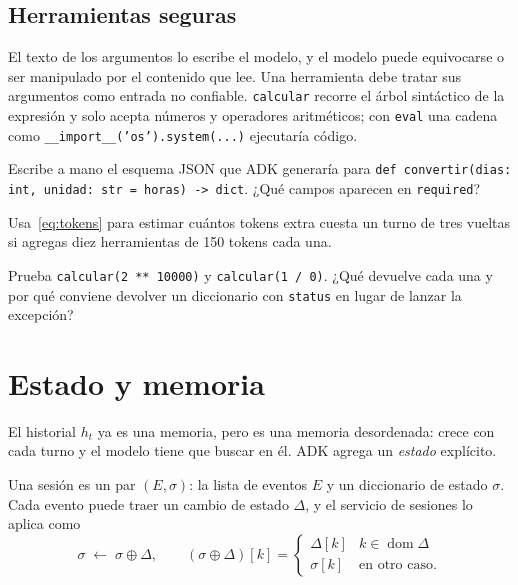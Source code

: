 \documentclass[11pt,letterpaper,oneside]{report}
\newcommand{\codigoagente}{../../../agentes/asistente_teresa/agent.py}
\begin{document}
\subsection{Herramientas seguras}

El texto de los argumentos lo escribe el modelo, y el modelo puede equivocarse o ser manipulado por el contenido que lee. Una herramienta debe tratar sus argumentos como entrada no confiable. \texttt{calcular} recorre el árbol sintáctico de la expresión y solo acepta números y operadores aritméticos; con \texttt{eval} una cadena como \texttt{\_\_import\_\_('os').system(...)} ejecutaría código.



\begin{ejercicio}
Escribe a mano el esquema JSON que ADK generaría para \texttt{def convertir(dias: int, unidad: str = \textquotedbl{}horas\textquotedbl{}) -> dict}. ¿Qué campos aparecen en \texttt{required}?
\end{ejercicio}

\begin{ejercicio}
Usa~\eqref{eq:tokens} para estimar cuántos tokens extra cuesta un turno de tres vueltas si agregas diez herramientas de 150 tokens cada una.
\end{ejercicio}

\begin{ejercicio}
Prueba \texttt{calcular(\textquotedbl{}2 ** 10000\textquotedbl{})} y \texttt{calcular(\textquotedbl{}1 / 0\textquotedbl{})}. ¿Qué devuelve cada una y por qué conviene devolver un diccionario con \texttt{status} en lugar de lanzar la excepción?
\end{ejercicio}

\section{Estado y memoria}

El historial $h_t$ ya es una memoria, pero es una memoria desordenada: crece con cada turno y el modelo tiene que buscar en él. ADK agrega un \emph{estado} explícito.

\begin{definicion}
Una sesión es un par $(E, \sigma)$: la lista de eventos $E$ y un diccionario de estado $\sigma$. Cada evento puede traer un cambio de estado $\Delta$, y el servicio de sesiones lo aplica como
\begin{equation}
\sigma \;\leftarrow\; \sigma \oplus \Delta, \qquad (\sigma\oplus\Delta)[k] = \begin{cases}\Delta[k] & k\in\operatorname{dom}\Delta\\ \sigma[k] & \text{en otro caso.}\end{cases}
\end{equation}
\end{definicion}
\end{document}
